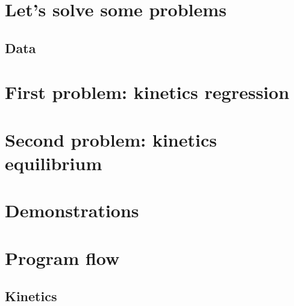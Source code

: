 \documentclass{article}
\begin{document}
\section{Let's solve some problems}
\subsection{Data}


\section{First problem: kinetics regression}


\section{Second problem: kinetics equilibrium}


\appendix
\section{Demonstrations}
\label{demo}


\section{Program flow}
\label{progflow}
\subsection{Kinetics}
\label{progflow:kinetics}

\end{document}

